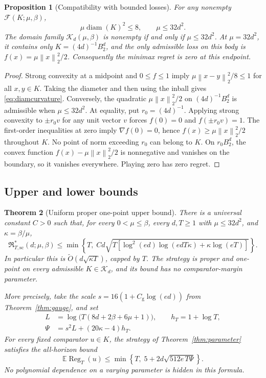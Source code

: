 \documentclass[11pt]{article}
\numberwithin{equation}{section}
\newcommand{\E}{\mathbb E}
\newcommand{\Reg}{\operatorname{Reg}}
\newcommand{\norm}[1]{\left\|#1\right\|}
\newcommand{\cK}{\mathcal K}
\newcommand{\cF}{\mathcal F}
\newcommand{\diam}{\operatorname{diam}}
\newtheorem{theorem}{Theorem}[section]
\newtheorem{proposition}[theorem]{Proposition}
\theoremstyle{definition}
\theoremstyle{remark}
\begin{document}
\begin{proposition}[Compatibility with bounded losses]\label{prop:admissibility}
For any nonempty $\cF(K;\mu,\beta)$,
\begin{equation}\label{eq:diamcurvature}
 \mu\diam(K)^2\leq8,\qquad \mu\leq32d^2.
\end{equation}
The domain family $\cK_d(\mu,\beta)$ is nonempty if and only if
$\mu\leq32d^2$. At $\mu=32d^2$, it contains only
$K=(4d)^{-1}B_2^d$, and the only admissible loss on this body is
$f(x)=\mu\norm{x}_2^2/2$. Consequently the minimax regret is zero at this endpoint.
\end{proposition}
\begin{proof}
Strong convexity at a midpoint and $0\leq f\leq1$ imply
$\mu\norm{x-y}_2^2/8\leq1$ for all $x,y\in K$. Taking the diameter and then
using the inball gives \eqref{eq:diamcurvature}. Conversely, the quadratic
$\mu\norm{x}_2^2/2$ on $(4d)^{-1}B_2^d$ is admissible when $\mu\leq32d^2$.
At equality, put $r_0=(4d)^{-1}$. Applying strong convexity to $\pm r_0v$ for
any unit vector $v$ forces $f(0)=0$ and $f(\pm r_0v)=1$. The first-order
inequalities at zero imply $\nabla f(0)=0$, hence
$f(x)\geq\mu\norm{x}_2^2/2$ throughout $K$. No point of norm exceeding $r_0$
can belong to $K$. On $r_0B_2^d$, the convex function
$f(x)-\mu\norm{x}_2^2/2$ is nonnegative and vanishes on the boundary, so it
vanishes everywhere. Playing zero has zero regret.
\end{proof}

\subsection{Upper and lower bounds}
\begin{theorem}[Uniform proper one-point upper bound]\label{thm:main}
There is a universal constant $C>0$ such that, for every $0<\mu\leq\beta$,
every $d,T\geq1$ with $\mu\leq32d^2$, and $\kappa=\beta/\mu$,
\begin{equation}\label{eq:generalupper}
 \mathfrak R^*_{T,\mathrm{sc}}(d;\mu,\beta)
 \leq\min\!\left\{T,\;C d\sqrt{T\left[
 \log^2(ed)\log(edT\kappa)+\kappa\log(eT)\right]}\right\}.
\end{equation}
In particular this is $\widetilde O(d\sqrt{\kappa T})$, capped by $T$.
The strategy is proper and one-point on every admissible $K\in\cK_d$, and its
bound has no comparator-margin parameter.

More precisely, take the scale $s=16(1+C_{\mathrm g}\log(ed))$ from
Theorem~\ref{thm:gauge}, and set
\begin{align}
 L&=\log\!\bigl(T(8d+2\beta+6\mu+1)\bigr),\qquad h_T=1+\log T,
       \label{eq:generalL}\\
 \Psi&=s^2L+(20\kappa-4)h_T.\label{eq:Psi}
\end{align}
For every fixed comparator $u\in K$, the strategy of
Theorem~\ref{thm:parameter} satisfies the all-horizon bound
\begin{equation}\label{eq:precisegeneral}
 \E\Reg_T(u)\leq\min\!\left\{T,\;5+2d\sqrt{512e\,T\Psi}\right\}.
\end{equation}
No polynomial dependence on a varying parameter is hidden in this formula.
\end{theorem}
\end{document}
